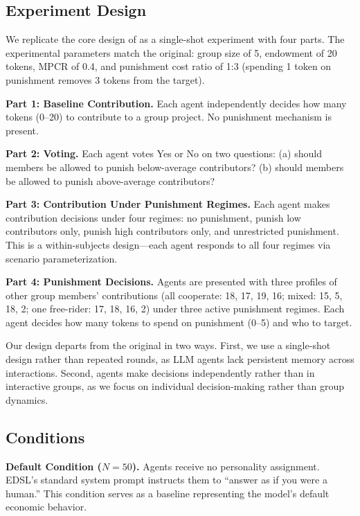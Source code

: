 \documentclass[12pt, a4paper]{article}
\begin{document}
\subsection{Experiment Design}

We replicate the core design of \citet{ertan2009who} as a single-shot experiment with four parts. The experimental parameters match the original: group size of 5, endowment of 20 tokens, MPCR of 0.4, and punishment cost ratio of 1:3 (spending 1 token on punishment removes 3 tokens from the target).

\textbf{Part 1: Baseline Contribution.} Each agent independently decides how many tokens (0--20) to contribute to a group project. No punishment mechanism is present.

\textbf{Part 2: Voting.} Each agent votes Yes or No on two questions: (a) should members be allowed to punish below-average contributors? (b) should members be allowed to punish above-average contributors?

\textbf{Part 3: Contribution Under Punishment Regimes.} Each agent makes contribution decisions under four regimes: no punishment, punish low contributors only, punish high contributors only, and unrestricted punishment. This is a within-subjects design---each agent responds to all four regimes via scenario parameterization.

\textbf{Part 4: Punishment Decisions.} Agents are presented with three profiles of other group members' contributions (all cooperate: 18, 17, 19, 16; mixed: 15, 5, 18, 2; one free-rider: 17, 18, 16, 2) under three active punishment regimes. Each agent decides how many tokens to spend on punishment (0--5) and who to target.

Our design departs from the original in two ways. First, we use a single-shot design rather than repeated rounds, as LLM agents lack persistent memory across interactions. Second, agents make decisions independently rather than in interactive groups, as we focus on individual decision-making rather than group dynamics.

\subsection{Conditions}

\textbf{Default Condition ($N = 50$).} Agents receive no personality assignment. EDSL's standard system prompt instructs them to ``answer as if you were a human.'' This condition serves as a baseline representing the model's default economic behavior.
\end{document}
